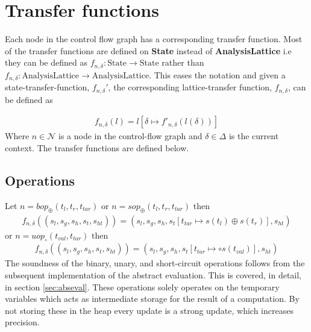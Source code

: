 \section{Transfer functions}
\label{sec:transferf}
\newcommand{\letin}[1]{\texttt{let } #1 \texttt{in }}
\newcommand{\ifelse}[3]{\texttt{if }#1\texttt{ then } #2 \texttt{ else } #3}
\newcommand{\match}[1]{\texttt{match }#1}
\newcommand{\with}[1]{\texttt{with }#1\text{: }}
\newcommand{\coerce}[2]{c_{\text{#1}, \text{#2}}}
\newcommand{\default}{\texttt{default: }}

Each node in the control flow graph has a corresponding transfer function. Most of the transfer functions are defined on {\bf State} instead of {\bf AnalysisLattice} i.e they can be defined as $f_{n,\delta} : \text{State} \rightarrow \text{State}$ rather than $f_{n,\delta} : \text{AnalysisLattice} \rightarrow \text{AnalysisLattice}$. This eases the notation and given a state-transfer-function, $f_{n,\delta}'$, the corresponding lattice-transfer function, $f_{n,\delta}$, can be defined as

\begin{align}
f_{n,\delta}(l) = l[\delta\mapsto f'_{n, \delta}(l(\delta))]
\end{align}
Where $n\in\mathcal{N}$ is a node in the control-flow graph and $\delta\in \Delta$ is the current context. The transfer functions are defined below.

\subsection{Operations}
Let $n = \mathit{bop}_\oplus(t_l,t_r,t_{tar})$ or $n =  \mathit{sop}_\oplus(t_l,t_r,t_{tar})$ then 
\begin{align}
f_{n,\delta}((s_l, s_g, s_h, s_t, s_{ht})) = (s_l, s_g, s_h, s_t[t_{tar}\mapsto s(t_l)\oplus s(t_r)], s_{ht})
\end{align}
or $n = uop_\circ(t_{val},t_{tar})$ then
\begin{align}
f_{n,\delta}((s_l, s_g, s_h, s_t, s_{ht})) = (s_l, s_g, s_h, s_t[t_{tar}\mapsto \circ s(t_{val})], s_{ht})
\end{align}
The soundness of the binary, unary, and short-circuit operations follows from the subsequent implementation of the abstract evaluation. This is covered, in detail, in section \ref{sec:abseval}. These operations solely operates on the temporary variables which acts as intermediate storage for the result of a computation.  By not storing these in the heap every update is a strong update, which increases precision.

